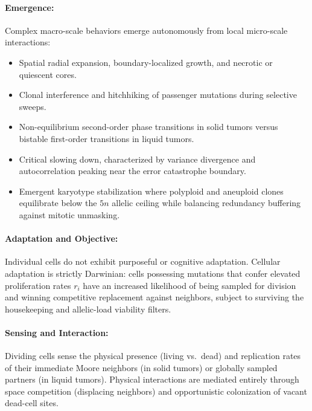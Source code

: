 \documentclass[11pt,a4paper]{article}
\begin{document}
\paragraph{Emergence:}
Complex macro-scale behaviors emerge autonomously from local micro-scale interactions:
\begin{itemize}
    \item Spatial radial expansion, boundary-localized growth, and necrotic or quiescent cores.
    \item Clonal interference and hitchhiking of passenger mutations during selective sweeps.
    \item Non-equilibrium second-order phase transitions in solid tumors versus bistable first-order transitions in liquid tumors.
    \item Critical slowing down, characterized by variance divergence and autocorrelation peaking near the error catastrophe boundary.
    \item Emergent karyotype stabilization where polyploid and aneuploid clones equilibrate below the $5n$ allelic ceiling while balancing redundancy buffering against mitotic unmasking.
\end{itemize}

\paragraph{Adaptation and Objective:}
Individual cells do not exhibit purposeful or cognitive adaptation. Cellular adaptation is strictly Darwinian: cells possessing mutations that confer elevated proliferation rates $r_i$ have an increased likelihood of being sampled for division and winning competitive replacement against neighbors, subject to surviving the housekeeping and allelic-load viability filters.

\paragraph{Sensing and Interaction:}
Dividing cells sense the physical presence (living vs.\ dead) and replication rates of their immediate Moore neighbors (in solid tumors) or globally sampled partners (in liquid tumors). Physical interactions are mediated entirely through space competition (displacing neighbors) and opportunistic colonization of vacant dead-cell sites.
\end{document}
